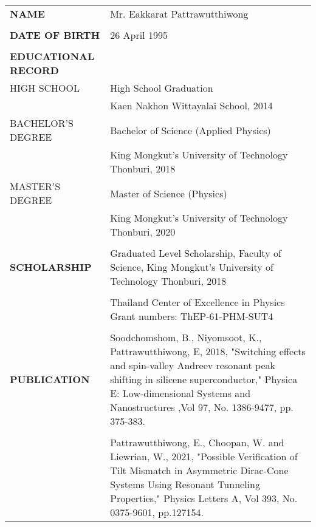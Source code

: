 \begin{longtable}{p{}p{}}
\textbf{NAME} & Mr. Eakkarat Pattrawutthiwong\\
\\

\textbf{DATE OF BIRTH} & 26 April  1995\\
\\

\textbf{EDUCATIONAL RECORD} & \\

HIGH SCHOOL & High School Graduation\\
            & Kaen Nakhon Wittayalai School, 2014 \\

BACHELOR'S DEGREE   & Bachelor of Science (Applied Physics) \\
                    & King Mongkut's University of Technology Thonburi, 2018 \\

MASTER'S DEGREE & Master of Science (Physics) \\
                & King Mongkut's University of Technology Thonburi, 2020 \\
\\

\textbf{SCHOLARSHIP}    & Graduated Level Scholarship, Faculty of Science, 
                        King Mongkut's University of Technology Thonburi, 2018\\
                        \\
                        &Thailand Center of Excellence in Physics Grant numbers: ThEP-61-PHM-SUT4\\
\\
\textbf{PUBLICATION}   & Soodchomshom, B., Niyomsoot, K., Pattrawutthiwong, E, 2018, 
                        "Switching effects and spin-valley Andreev resonant peak shifting in silicene superconductor," 
                        Physica E: Low-dimensional Systems and Nanostructures
                        ,Vol 97, No. 1386-9477, pp. 375-383.\\
                        \\

                        &Pattrawutthiwong, E., Choopan, W. and Liewrian, W., 2021,
                        "Possible Verification of Tilt Mismatch in Asymmetric Dirac-Cone Systems Using Resonant Tunneling Properties," 
                        Physics Letters A, Vol 393, No. 0375-9601, pp.127154.\\

\end{longtable}

